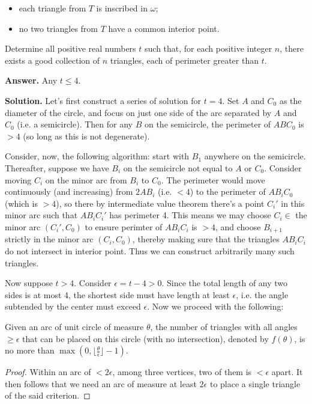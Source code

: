 \documentclass[11pt,a4paper]{article}
\begin{document}
\begin{enumerate}
	\begin{itemize}
		\item each triangle from $T$ is inscribed in $\omega$;
		
		\item no two triangles from $T$ have a common interior point.
	\end{itemize}
	Determine all positive real numbers $t$ such that, for each positive integer $n$, there exists a good collection of $n$ triangles, each of perimeter greater than $t$.
	
	\textbf{Answer.} Any $t\le 4$. 
	
	\textbf{Solution.} 
	Let's first construct a series of solution for $t=4$. 
	Set $A$ and $C_0$ as the diameter of the circle, and focus on just one side of the arc separated by $A$ and $C_0$ (i.e. a semicircle). 
	Then for any $B$ on the semicircle, the perimeter of $ABC_0$ is $>4$ (so long as this is not degenerate). 
	
	Consider, now, the following algorithm: start with $B_1$ anywhere on the semicircle. 
	Thereafter, suppose we have $B_i$ on the semicircle not equal to $A$ or $C_0$. 
	Consider moving $C_i$ on the minor arc from $B_i$ to $C_0$. 
	The perimeter would move continuously (and increasing) 
	from $2AB_i$ (i.e. $<4$) to the perimeter of $AB_iC_0$ (which is $>4$), 
	so there by intermediate value theorem there's a point $C_i'$ in this minor arc such that $AB_iC_i'$ has perimeter 4. 
	This means we may choose $C_i\in$ the minor arc $(C_i', C_0)$ to ensure perimter of $AB_iC_i$ is $>4$, 
	and choose $B_{i+1}$ strictly in the minor arc $(C_i, C_0)$, 
	thereby making sure that the triangles $AB_iC_i$ do not intersect in interior point. 
	Thus we can construct arbitrarily many such triangles. 
	
	Now suppose $t>4$. Consider $\epsilon=t - 4>0$. Since the total length of any two sides is at most 4, the shortest side must have length at least $\epsilon$, i.e. the angle subtended by the center must exceed $\epsilon$. Now we proceed with the following: 
	
	\begin{lemma}
		  Given an arc of unit circle of measure $\theta$, the number of triangles with all angles $\ge \epsilon$ that can be placed on this circle (with no intersection), denoted by $f(\theta)$, is no more than $\max(0, \lfloor \frac{\theta}{\epsilon}\rfloor - 1)$. 
	\end{lemma}
	
	\begin{proof}
		Within an arc of $<2\epsilon$, among three vertices, two of them is $<\epsilon$ apart. 
		It then follows that we need an arc of measure at least $2\epsilon$ to place a single triangle of the said criterion. 
		

\end{proof}
\end{enumerate}
\end{document}

